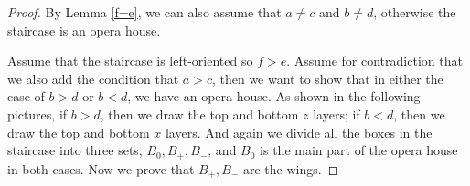 \documentclass{amsart}[10pt]
\theoremstyle{plain}
\theoremstyle{definition}
\begin{document}
\begin{proof}
By Lemma \ref{f=e}, we can also assume that $a \neq c$ and $b \neq d$, otherwise the staircase is an opera house.

Assume that the staircase is left-oriented so $f >e$. Assume for contradiction that we also add the condition that $a>c$, then we want to show that in either the case of $b >d$ or $b <d$, we have an opera house. As shown in the following pictures, if $b >d$, then we draw the top and bottom $z$ layers; if $b <d$, then we draw the top and bottom $x$ layers. And again we divide all the boxes in the staircase into three sets, $B_0, B_+, B_-$, and $B_0$ is the main part of the opera house in both cases. %
Now we prove that $B_+,B_-$ are the wings.


\end{proof}
\end{document}
